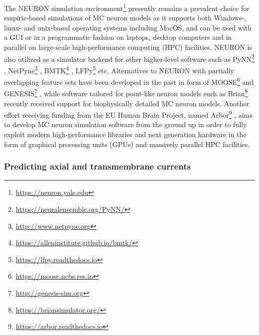 The NEURON simulation environment\footnote{\href{https://neuron.yale.edu}{https://neuron.yale.edu}} \cite{Hines1997} presently remains a prevalent choice for empiric-based simulations of MC neuron models as it supports both Windows-,
linux- and unix-based operating systems including MacOS,
and can be used with a GUI or in a programmatic fashion on laptops, desktop computers and in parallel on large-scale high-performance computing (HPC) facilities.
NEURON is also utilized as a simulator backend for other higher-level software such as
PyNN\footnote{\href{https://neuralensemble.org/PyNN/}{https://neuralensemble.org/PyNN/}} \cite{Davison2008},
NetPyne\footnote{\href{http://www.netpyne.org}{http://www.netpyne.org}} \cite{Dura_Bernal_2019},
BMTK\footnote{\href{https://alleninstitute.github.io/bmtk/}{https://alleninstitute.github.io/bmtk/}} \cite{Dai2020},
LFPy\footnote{\href{https://lfpy.readthedocs.io}{https://lfpy.readthedocs.io}} \cite{Linden2014,Hagen2018} etc.
Alternatives to NEURON with partially overlapping feature sets have been developed in the past in form of
MOOSE\footnote{\href{https://moose.ncbs.res.in}{https://moose.ncbs.res.in}} \cite{Bhalla2008} and
GENESIS\footnote{\href{http://genesis-sim.org}{http://genesis-sim.org}} \cite{Bower1998},
while software tailored for point-like neuron models such as
Brian\footnote{\href{https://briansimulator.org/}{https://briansimulator.org/}} \cite{Stimberg2019} recently received support for biophysically detailed MC neuron models.
Another effort receiving funding from the EU Human Brain Project,
named Arbor\footnote{\href{https://arbor.readthedocs.io}{https://arbor.readthedocs.io}} \cite{Akar2019},
aims to develop MC neuron simulation software from the ground up in order to fully exploit modern high-performance libraries and next generation hardware in the form of graphical processing units (GPUs) and massively parallel HPC facilities.


\subsubsection{Predicting axial and transmembrane currents}
\label{chap:LFPy_Ia_Im}

